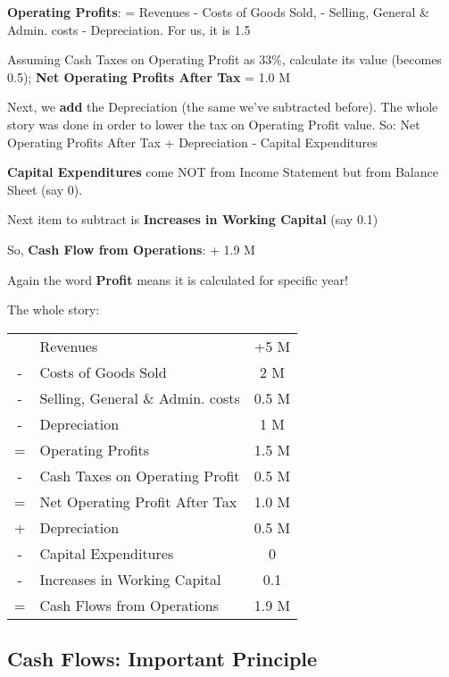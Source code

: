 \documentclass{scrartcl}
\begin{document}
{\bf Operating Profits}: = Revenues - Costs of Goods Sold, - Selling, General \&
Admin. costs - Depreciation. For us, it is 1.5

Assuming Cash Taxes on Operating Profit as 33\%, calculate its value (becomes
0.5); {\bf Net Operating Profits After Tax} = 1.0 M

Next, we {\bf add} the Depreciation (the same we've subtracted before). The
whole story was done in order to lower the tax on Operating Profit value. So:
Net Operating Profits After Tax + Depreciation - Capital Expenditures

{\bf Capital Expenditures} come NOT from Income Statement but from Balance Sheet
(say 0).

Next item to subtract is {\bf Increases in Working Capital} (say 0.1)

So, {\bf Cash Flow from Operations}: + 1.9 M

Again the word {\bf Profit} means it is calculated for specific year!

The whole story:

\begin{tabular}{cl|c}
  \hline
  & Revenues & +5 M \\
  - & Costs of Goods Sold & 2 M \\
  - & Selling, General \& Admin. costs & 0.5 M \\
  - & Depreciation & 1 M\\
  \hline
  = & Operating Profits &  1.5 M \\
  - & Cash Taxes on Operating Profit & 0.5 M \\
  \hline
  = & Net Operating Profit After Tax & 1.0 M \\
  + & Depreciation & 0.5 M \\
  - & Capital Expenditures & 0 \\
  - & Increases in Working Capital & 0.1 \\
  \hline
  = & Cash Flows from Operations & 1.9 M \\
\end{tabular}

\subsection{Cash Flows: Important Principle}
\end{document}
